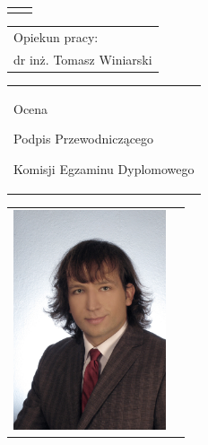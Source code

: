 \begin{titlepage}
\begin{center}
	\vspace*{1\baselineskip}
	\hfill\mbox{}\par\vspace*{\baselineskip}\noindent
	\begin{tabular}[b]{@{}p{3cm}@{\ }l@{}}
	    {\large\hfill } & {\large }
	\end{tabular}
	\hfill
	\begin{tabular}[b]{@{}l@{}}
	Opiekun pracy: \\[\smallskipamount]
	{\large dr inż. Tomasz Winiarski}
	\end{tabular}\par
	\vspace*{4\baselineskip}
\begin{tabular}{p{\textwidth}}
    \begin{flushleft}
	\begin{minipage}{7cm}
	Ocena \dotfill
	\par\vspace{1.6\baselineskip}
	\dotfill
	\par\noindent
	\centerline{\footnotesize Podpis Przewodniczącego} \par
	\centerline{\footnotesize Komisji Egzaminu Dyplomowego}\par
	\end{minipage}
    \end{flushleft}
    \end{tabular}
    \end{center}


	    \cleardoublepage
    \newpage\thispagestyle{empty}
    \begin{tabular}{p{5cm} p{11cm}}

    \begin{minipage}{5cm}
    \center
    \includegraphics[height=6.5cm,width=4.5cm]{../img/foto}
    \end{minipage}
    &


\end{tabular}
\end{titlepage}
